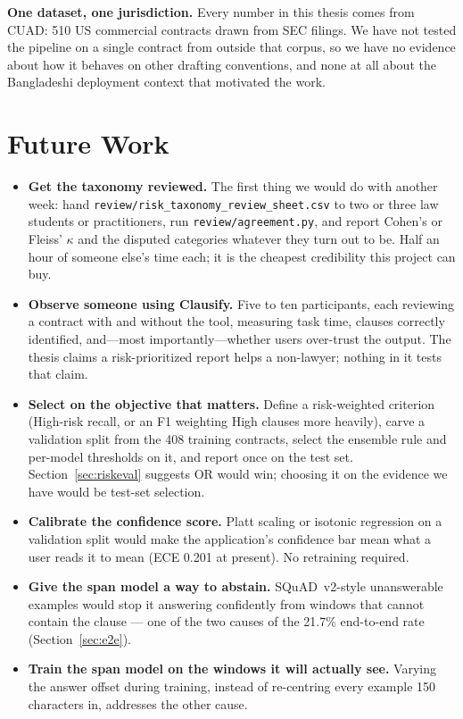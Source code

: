 \textbf{One dataset, one jurisdiction.} Every number in this thesis comes from CUAD: 510 US commercial contracts drawn from SEC filings. We have not tested the pipeline on a single contract from outside that corpus, so we have no evidence about how it behaves on other drafting conventions, and none at all about the Bangladeshi deployment context that motivated the work.

\section{Future Work}
\begin{itemize}[itemsep=2pt]
  \item \textbf{Get the taxonomy reviewed.} The first thing we would do with another week: hand \texttt{review/risk\_taxonomy\_review\_sheet.csv} to two or three law students or practitioners, run \texttt{review/agreement.py}, and report Cohen's or Fleiss' $\kappa$ and the disputed categories whatever they turn out to be. Half an hour of someone else's time each; it is the cheapest credibility this project can buy.
  \item \textbf{Observe someone using Clausify.} Five to ten participants, each reviewing a contract with and without the tool, measuring task time, clauses correctly identified, and---most importantly---whether users over-trust the output. The thesis claims a risk-prioritized report helps a non-lawyer; nothing in it tests that claim.
  \item \textbf{Select on the objective that matters.} Define a risk-weighted criterion (High-risk recall, or an F1 weighting High clauses more heavily), carve a validation split from the 408 training contracts, select the ensemble rule and per-model thresholds on it, and report once on the test set. Section~\ref{sec:riskeval} suggests OR would win; choosing it on the evidence we have would be test-set selection.
  \item \textbf{Calibrate the confidence score.} Platt scaling or isotonic regression on a validation split would make the application's confidence bar mean what a user reads it to mean (ECE 0.201 at present). No retraining required.
  \item \textbf{Give the span model a way to abstain.} SQuAD~v2-style unanswerable examples would stop it answering confidently from windows that cannot contain the clause --- one of the two causes of the 21.7\% end-to-end rate (Section~\ref{sec:e2e}).
  \item \textbf{Train the span model on the windows it will actually see.} Varying the answer offset during training, instead of re-centring every example 150 characters in, addresses the other cause.

\end{itemize}

